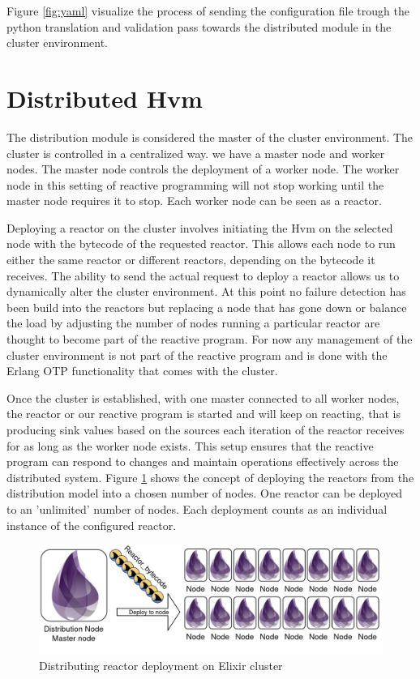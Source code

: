 \documentclass[a4paper]{book}
\begin{document}
Figure \ref{fig:yaml} visualize the process of sending the configuration file trough the python translation and validation pass towards the distributed module in the cluster environment. 


\section{Distributed Hvm}
The distribution module is considered the master of the cluster environment. The cluster is controlled in a centralized way. we have a master node and worker nodes. The master node controls the deployment of a worker node. The worker node in this setting of reactive programming will not stop working until the master node requires it to stop. Each worker node can be seen as a reactor.  

Deploying a reactor on the cluster involves initiating the Hvm on the selected node with the bytecode of the requested reactor. This allows each node to run either the same reactor or different reactors, depending on the bytecode it receives. The ability to send the actual request to deploy a reactor allows us to dynamically alter the cluster environment. At this point no failure detection has been build into the reactors but replacing a node that has gone down or balance the load by adjusting the number of nodes running a particular reactor are thought to become part of the reactive program. For now any management of the cluster environment is not part of the reactive program and is done with the Erlang OTP functionality that comes with the cluster.

Once the cluster is established, with one master connected to all worker nodes, the reactor or our reactive program is started and will keep on reacting, that is producing sink values based on the sources each iteration of the reactor receives for as long as the worker node exists. This setup ensures that the reactive program can respond to changes and maintain operations effectively across the distributed system. Figure \ref{fig:rdi} shows the concept of deploying the reactors from the distribution model into a chosen number of nodes. One reactor can be deployed to an 'unlimited' number of nodes. Each deployment counts as an individual instance of the configured reactor. 

\begin{figure}[h]
	\includegraphics[width=\textwidth]{distribution300.drawio}
	\caption{Distributing reactor deployment on Elixir cluster}
	\label{fig:rdi}
\end{figure}  
\end{document}
